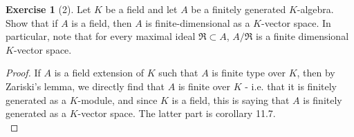 \documentclass[reqno]{amsart}
\theoremstyle{definition}
\newtheorem{exercise}[theorem]{Exercise}
\theoremstyle{remark}
\begin{document}
    \begin{exercise}[2]
        Let $K$ be a field and let $A$ be a finitely
        generated $K$-algebra. Show that if
        $A$ is a field, then $A$ is finite-dimensional
        as a $K$-vector space. In particular, note that
        for every maximal ideal 
        $\mathfrak{R} \subset A$, 
        $A / \mathfrak{R}$ is a finite dimensional
        $K$-vector space.
    \end{exercise}


    \begin{proof}
        If $A$ is a field extension of $K$ such that
        $A$ is finite type over $K$, then
        by Zariski's lemma, we directly find that
        $A$ is finite over $K$ - i.e. that it
        is finitely generated as a $K$-module, and since
        $K$ is a field, this is saying that
        $A$ is finitely generated as a $K$-vector space.
        The latter part is corollary 11.7.\\
        \linebreak
    \end{proof}








\end{document}
